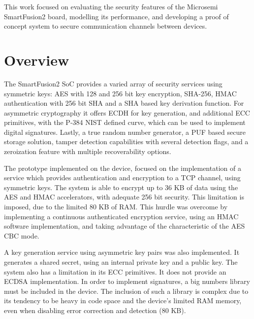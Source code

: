 \cleardoublepage
\label{chap:conclusion}

This work focused on evaluating the security features of the Microsemi SmartFusion2 board, modelling its performance, and developing a proof of concept system to secure communication channels between devices.

\section{Overview} \label{chap:conclusion:overview}

The SmartFusion2 SoC provides a varied array of security services using symmetric keys: AES with 128 and 256 bit key encryption, SHA-256, HMAC authentication with 256 bit SHA and a SHA based key derivation function. For asymmetric cryptography it offers ECDH for key generation, and additional ECC primitives, with the P-384 NIST defined curve, which can be used to implement digital signatures. Lastly, a true random number generator, a PUF based secure storage solution, tamper detection capabilities with several detection flags, and a zeroization feature with multiple recoverability options.

The prototype implemented on the device, focused on the implementation of a service which provides authentication and encryption to a TCP channel, using symmetric keys. The system is able to encrypt up to 36 KB of data using the AES and HMAC accelerators, with adequate 256 bit security. This limitation is imposed, due to the limited 80 KB of RAM.
This hurdle was overcome by implementing a continuous authenticated encryption service, using an HMAC software implementation, and taking advantage of the characteristic of the AES CBC mode.

A key generation service using asymmetric key pairs was also implemented. It generates a shared secret, using an internal private key and a public key.
The system also has a limitation in its ECC primitives. It does not provide an ECDSA implementation. In order to implement signatures, a big numbers library must be included in the device. The inclusion of such a library is complex due to its tendency to be heavy in code space and the device's limited RAM memory, even when disabling error correction and detection (80 KB). 

